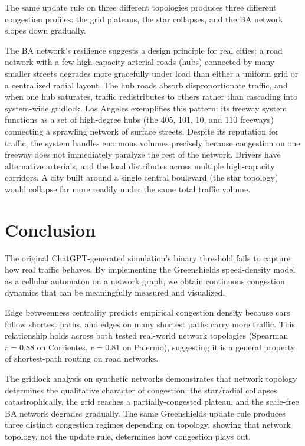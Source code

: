 \documentclass[12pt]{article}
\begin{document}
\vspace{0.5em}
The same update rule on three different topologies produces three different congestion profiles: the grid plateaus, the star collapses, and the BA network slopes down gradually.

\vspace{0.5em}
The BA network's resilience suggests a design principle for real cities: a road network with a few high-capacity arterial roads (hubs) connected by many smaller streets degrades more gracefully under load than either a uniform grid or a centralized radial layout. The hub roads absorb disproportionate traffic, and when one hub saturates, traffic redistributes to others rather than cascading into system-wide gridlock. Los Angeles exemplifies this pattern: its freeway system functions as a set of high-degree hubs (the 405, 101, 10, and 110 freeways) connecting a sprawling network of surface streets. Despite its reputation for traffic, the system handles enormous volumes precisely because congestion on one freeway does not immediately paralyze the rest of the network. Drivers have alternative arterials, and the load distributes across multiple high-capacity corridors. A city built around a single central boulevard (the star topology) would collapse far more readily under the same total traffic volume.


\section{Conclusion}

The original ChatGPT-generated simulation's binary threshold fails to capture how real traffic behaves. By implementing the Greenshields speed-density model as a cellular automaton on a network graph, we obtain continuous congestion dynamics that can be meaningfully measured and visualized.

Edge betweenness centrality predicts empirical congestion density because cars follow shortest paths, and edges on many shortest paths carry more traffic. This relationship holds across both tested real-world network topologies (Spearman $r = 0.88$ on Corrientes, $r = 0.81$ on Palermo), suggesting it is a general property of shortest-path routing on road networks.

The gridlock analysis on synthetic networks demonstrates that network topology determines the qualitative character of congestion: the star/radial collapses catastrophically, the grid reaches a partially-congested plateau, and the scale-free BA network degrades gradually. The same Greenshields update rule produces three distinct congestion regimes depending on topology, showing that network topology, not the update rule, determines how congestion plays out.
\end{document}
